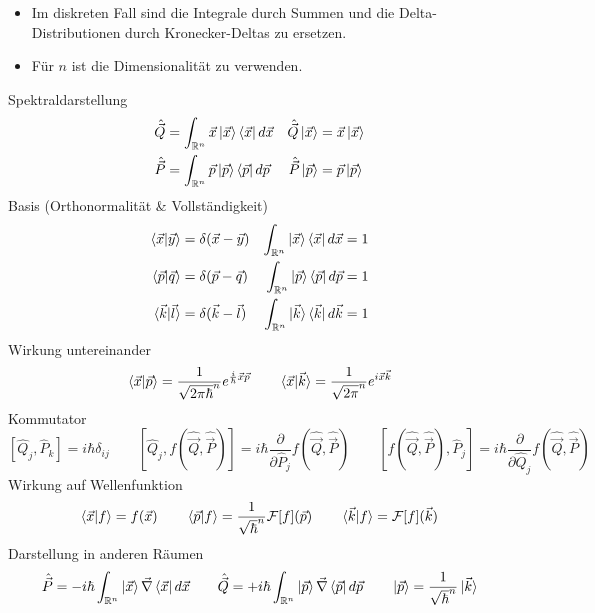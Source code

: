 
\begin{itemize}
    \item Im diskreten Fall sind die Integrale durch Summen und die Delta-Distributionen durch Kronecker-Deltas zu ersetzen.
    \item Für $n$ ist die Dimensionalität zu verwenden.
\end{itemize}
Spektraldarstellung \cite[Glg. A.96, A.99, A.127, A.128]{qm}
\begin{align*}
	\hat{\vec{Q}} &= \int_{\mathbb{R}^n}\vec{x}\ket{\vec{x}}\bra{\vec{x}}d\vec{x} & \hat{\vec{Q}}\ket{\vec{x}} &= \vec{x}\ket{\vec{x}} \\
	\hat{\vec{P}} &= \int_{\mathbb{R}^n}\vec{p}\ket{\vec{p}}\bra{\vec{p}}d\vec{p} & \hat{\vec{P}}\ket{\vec{p}} &= \vec{p}\ket{\vec{p}}
\end{align*}
Basis (Orthonormalität \& Vollständigkeit) \cite[Glg. A.85, A.86, A.122, A.124, A.106, A.108]{qm}
\begin{align*}
	\braket{\vec{x}|\vec{y}} &= \delta(\vec{x}-\vec{y}) & \int_{\mathbb{R}^n}\ket{\vec{x}}\bra{\vec{x}}d\vec{x} &= 1 \\
	\braket{\vec{p}|\vec{q}} &= \delta(\vec{p}-\vec{q}) & \int_{\mathbb{R}^n}\ket{\vec{p}}\bra{\vec{p}}d\vec{p} &= 1 \\
	\braket{\vec{k}|\vec{l}} &= \delta(\vec{k}-\vec{l}) & \int_{\mathbb{R}^n}\ket{\vec{k}}\bra{\vec{k}}d\vec{k} &= 1
\end{align*}
Wirkung untereinander \cite[Glg. A.129, S. A.56]{qm}
\begin{equation*}
	\braket{\vec{x}|\vec{p}} = \frac{1}{\sqrt{2\pi\hbar}^n}e^{\frac{i}{\hbar}\vec{x}\vec{p}} \qquad \braket{\vec{x}|\vec{k}} = \frac{1}{\sqrt{2\pi}^n}e^{i\vec{x}\vec{k}}
\end{equation*}
Kommutator \cite[Glg. A.151, A.152, A.153]{qm}
\begin{equation*}
	\left[\hat{Q}_j,\hat{P}_k\right] = i\hbar\delta_{ij} \qquad \left[\hat{Q}_j,f(\hat{\vec{Q}},\hat{\vec{P}})\right] = i\hbar\frac{\partial}{\partial\hat{P}_j}f(\hat{\vec{Q}},\hat{\vec{P}}) \qquad \left[f(\hat{\vec{Q}},\hat{\vec{P}}),\hat{P}_j\right] = i\hbar\frac{\partial}{\partial\hat{Q}_j}f(\hat{\vec{Q}},\hat{\vec{P}})
\end{equation*}
Wirkung auf Wellenfunktion \cite[Glg. A.83, A.125, A.113]{qm}
\begin{equation*}
	\braket{\vec{x}|f} = f(\vec{x}) \qquad \braket{\vec{p}|f} = \frac{1}{\sqrt{\hbar}^n}\mathcal{F}[f](\vec{p}) \qquad \braket{\vec{k}|f} = \mathcal{F}[f](\vec{k})
\end{equation*}
Darstellung in anderen Räumen \cite[Glg. A.132, eigene Folgerung, S. A.60]{qm}
\begin{equation*}
	\hat{\vec{P}} = -i\hbar\int_{\mathbb{R}^n}\ket{\vec{x}}\vec{\nabla}\bra{\vec{x}}d\vec{x} \qquad \hat{\vec{Q}} = +i\hbar\int_{\mathbb{R}^n}\ket{\vec{p}}\vec{\nabla}\bra{\vec{p}}d\vec{p} \qquad \ket{\vec{p}} = \frac{1}{\sqrt{\hbar}^n}\ket{\vec{k}}
\end{equation*}
